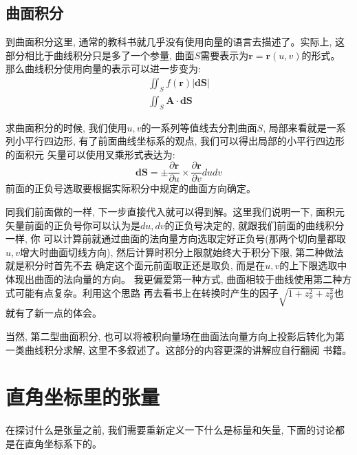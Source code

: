 \subsection*{曲面积分}
到曲面积分这里, 通常的教科书就几乎没有使用向量的语言去描述了。实际上, 这部分相比于曲线积分只是多了一个参量, 曲面$S$需要表示为$\bm{r}=\bm{r}(u,v)$的形式。
那么曲线积分使用向量的表示可以进一步变为:
\begin{align}
    \iint_S f(\bm{r})|\bm{dS}|\\
    \iint_S \bm{A}\cdot\bm{dS}
\end{align}

求曲面积分的时候, 我们使用$u,v$的一系列等值线去分割曲面$S$, 局部来看就是一系列小平行四边形, 有了前面曲线坐标系的观点, 我们可以得出局部的小平行四边形的面积元
矢量可以使用叉乘形式表达为:
$$\bm{dS}=\pm\frac{\partial \bm{r}}{\partial u}\times\frac{\partial \bm{r}}{\partial v}dudv$$
前面的正负号选取要根据实际积分中规定的曲面方向确定。

同我们前面做的一样, 下一步直接代入就可以得到解。这里我们说明一下, 面积元矢量前面的正负号你可以认为是$du,dv$的正负号决定的, 就跟我们前面的曲线积分一样, 你
可以计算前就通过曲面的法向量方向选取定好正负号(那两个切向量都取$u,v$增大时曲面切线方向), 然后计算时积分上限就始终大于积分下限, 第二种做法就是积分时首先不去
确定这个面元前面取正还是取负, 而是在$u,v$的上下限选取中体现出曲面的法向量的方向。 我更偏爱第一种方式, 曲面相较于曲线使用第二种方式可能有点复杂。利用这个思路
再去看书上在转换时产生的因子$\sqrt{1+z_x^2+z_y^2}$也就有了新一点的体会。

当然, 第二型曲面积分, 也可以将被积向量场在曲面法向量方向上投影后转化为第一类曲线积分求解, 这里不多叙述了。这部分的内容更深的讲解应自行翻阅
书籍。
\section{直角坐标里的张量}
在探讨什么是张量之前, 我们需要重新定义一下什么是标量和矢量, 下面的讨论都是在直角坐标系下的。

